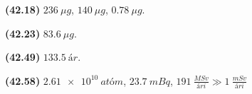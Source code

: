 \ifdefined \wholebook \else\documentclass[oneside]{book}\usepackage{EdlBook}\graphicspath{{figures/}}
\begin{document}
\begin{tcolorbox}
\begin{enumerate*}[label = ]
  \item \textbf{(42.18)} $\SI{236}{\mu g}$, $\SI{140}{\mu g}$, $\SI{0.78}{\mu g}$.
  \item \textbf{(42.23)} $\SI{83.6}{\mu g}$.
  \item \textbf{(42.49)} $\SI{133.5}{ár}$.
  \item \textbf{(42.58)} $\SI{2.61e10}{atóm}$, $\SI{23.7}{mBq}$, $\SI{191}{\frac{MSv}{ári}} \gg \SI{1}{\frac{mSv}{ári}}$
\end{enumerate*}
\end{tcolorbox}

\newpage



\ifdefined \wholebook \else
 \printindex
\end{document}

